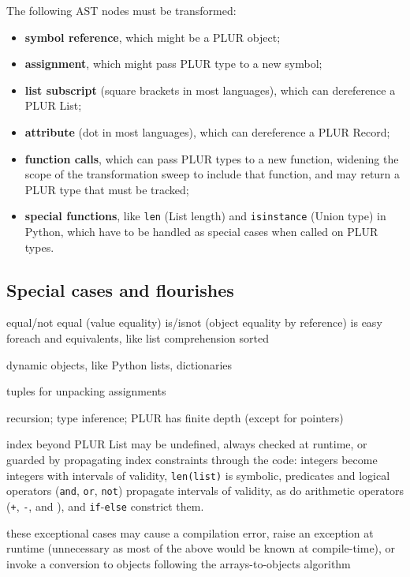 \documentclass[10pt, conference, compsocconf]{IEEEtran}
\begin{document}
The following AST nodes must be transformed:
\begin{itemize}
\item {\bf symbol reference}, which might be a PLUR object;
\item {\bf assignment}, which might pass PLUR type to a new symbol;
\item {\bf list subscript} (square brackets in most languages), which can dereference a PLUR List;
\item {\bf attribute} (dot in most languages), which can dereference a PLUR Record;
\item {\bf function calls}, which can pass PLUR types to a new function, widening the scope of the transformation sweep to include that function, and may return a PLUR type that must be tracked;
\item {\bf special functions}, like {\tt len} (List length) and {\tt isinstance} (Union type) in Python, which have to be handled as special cases when called on PLUR types.
\end{itemize}








\subsection{Special cases and flourishes}

equal/not equal (value equality)
is/isnot (object equality by reference) is easy
foreach and equivalents, like list comprehension
sorted

dynamic objects, like Python lists, dictionaries

tuples for unpacking assignments

recursion; type inference; PLUR has finite depth (except for pointers)

index beyond PLUR List may be undefined, always checked at runtime, or guarded by propagating index constraints through the code: integers become integers with intervals of validity, {\tt len(list)} is symbolic, predicates and logical operators ({\tt and}, {\tt or}, {\tt not}) propagate intervals of validity, as do arithmetic operators ({\tt +}, {\tt -}, and {\tt *}), and {\tt if}-{\tt else} constrict them.

these exceptional cases may cause a compilation error, raise an exception at runtime (unnecessary as most of the above would be known at compile-time), or invoke a conversion to objects following the arrays-to-objects algorithm
\end{document}
